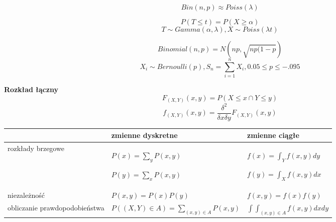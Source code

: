 \documentclass[a4paper]{article}
\begin{document}
    \begin{equation}
        Bin(n, p) \approx Poiss(\lambda)
    \end{equation}

    \begin{equation}
        P(T \leq t) = P( X \geq \alpha)
    \end{equation}
    \begin{equation*}
        T \sim Gamma(\alpha, \lambda), X \sim Poiss(\lambda t)
    \end{equation*}

    \begin{equation}
        Binomial(n, p) = N(np, \sqrt{np(1-p})
    \end{equation}
    \begin{equation*}
        X_i \sim Bernoulli(p), S_n = \sum_{i=1}^{n} X_i, 0.05 \leq p \leq -.095
    \end{equation*}


    \textbf{Rozkład łączny}
    \begin{equation*}
        F_{(X,Y)}(x,y) = P( X \leq x \cap Y \leq y)
    \end{equation*}
    \begin{equation*}
        f_{(X,Y)}(x,y) = \frac{\delta^2}{\delta x \delta y} F_{(X,Y)}(x,y)
    \end{equation*}

    \begin{table}[H]
        \begin{center}
            \begin{tabular}{ p{5cm} | p{5.5cm} p{5cm} }
                & zmienne dyskretne & zmienne ciągłe\\
                \toprule
                rozkłady brzegowe &
                $P(x) = \sum_y P(x,y)$

                $P(y) = \sum_x P(x,y)$

                &
                $f(x) = \int_{Y} f(x,y)dy$

                $f(y) = \int_{X} f(x,y)dx$
                \\

                niezależność &
                $P(x,y) = P(x)P(y)$ &
                $f(x,y) = f(x)f(y)$
                \\

                obliczanie prawdopodobieństwa &
                $P( (X,Y) \in A) = \sum_{(x,y) \in A} P(x,y)$ &
                $\int \int_{(x,y) \in A} f(x,y)dx dy$\\

                \bottomrule
            \end{tabular}
        \end{center}
    \end{table}
\end{document}
